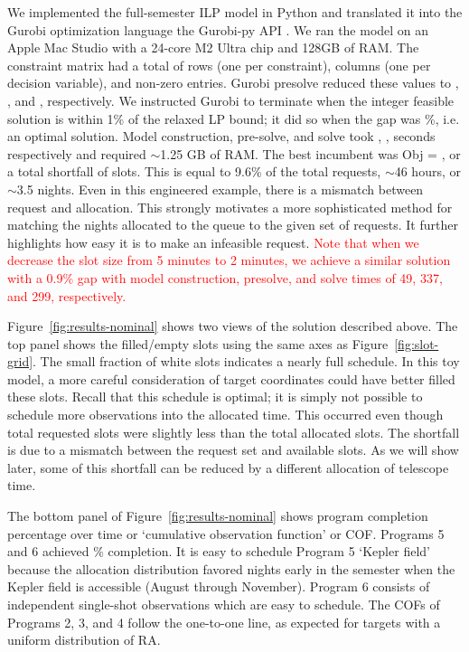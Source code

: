\documentclass[twocolumn,linenumbers]{aastex63}
\newcommand{\red}[1]{\textcolor{red}{#1}}
\begin{document}
We implemented the full-semester ILP model in Python and translated it into the Gurobi optimization language the Gurobi-py API \citep{gurobi}. We ran the model on an Apple Mac Studio with a 24-core M2 Ultra chip and 128GB of RAM. The constraint matrix had a total of  rows (one per constraint),  columns (one per decision variable), and  non-zero entries. Gurobi presolve reduced these values to , , and , respectively. We instructed Gurobi to terminate when the integer feasible solution is within 1\% of the relaxed LP bound; it did so when the gap was \%, i.e. an optimal solution. Model construction, pre-solve, and solve took , ,  seconds respectively and required $\sim$1.25 GB of RAM. The best incumbent was Obj = , or a total shortfall of  slots. This is equal to 9.6\% of the total requests, $\sim$46 hours, or $\sim$3.5 nights. Even in this engineered example, there is a mismatch between request and allocation. This strongly motivates a more sophisticated method for matching the nights allocated to the queue to the given set of requests. It further highlights how easy it is to make an infeasible request. \red{Note that when we decrease the slot size from 5 minutes to 2 minutes, we achieve a similar solution with a 0.9\% gap with model construction, presolve, and solve times of 49, 337, and 299, respectively.}

Figure~\ref{fig:results-nominal} shows two views of the solution described above. The top panel shows the filled/empty slots using the same axes as Figure~\ref{fig:slot-grid}. The small fraction of white slots indicates a nearly full schedule. In this toy model, a more careful consideration of target coordinates could have better filled these slots.  Recall that this schedule is optimal; it is simply not possible to schedule more observations into the allocated time. This occurred even though total requested slots were slightly less than the total allocated slots. The shortfall is due to a mismatch between the request set and available slots. As we will show later, some of this shortfall can be reduced by a different allocation of telescope time.

The bottom panel of Figure~\ref{fig:results-nominal} shows program completion percentage over time or `cumulative observation function' or COF. Programs 5 and 6 achieved \% completion. It is easy to schedule Program 5 `Kepler field' because the allocation distribution favored nights early in the semester when the Kepler field is accessible (August through November). Program 6 consists of independent single-shot observations which are easy to schedule. The COFs of Programs 2, 3, and 4 follow the one-to-one line, as expected for targets with a uniform distribution of RA.
\end{document}
